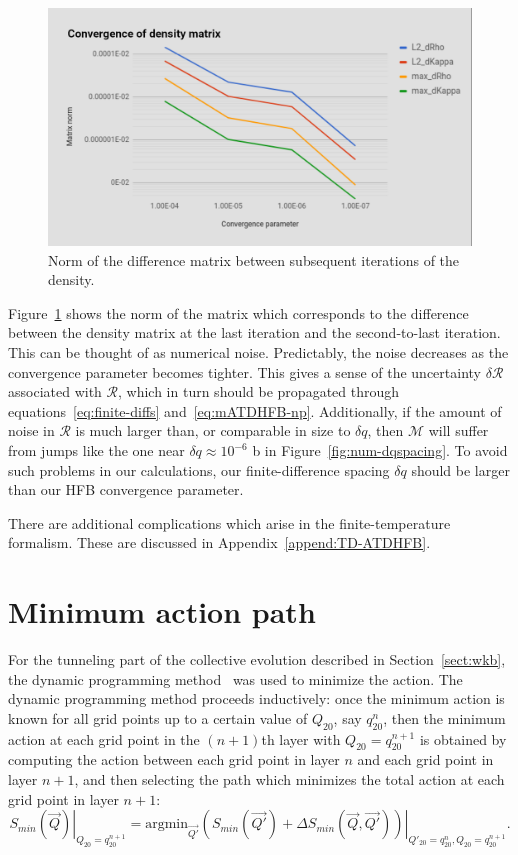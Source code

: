 \begin{figure}
	\centering
	\includegraphics[width=0.7\linewidth]{TeX_files/Num-rho_conv}
	\caption{Norm of the difference matrix between subsequent iterations of the density.}
	\label{fig:num-rhoconv}
\end{figure}

Figure~\ref{fig:num-rhoconv} shows the norm of the matrix which corresponds to the difference between the density matrix at the last iteration and the second-to-last iteration. This can be thought of as numerical noise. Predictably, the noise decreases as the convergence parameter becomes tighter. This gives a sense of the uncertainty $\delta \mathcal{R}$ associated with $\mathcal{R}$, which in turn should be propagated through equations~\eqref{eq:finite-diffs} and~\eqref{eq:mATDHFB-np}. Additionally, if the amount of noise in $\mathcal{R}$ is much larger than, or comparable in size to $\delta q$, then $\mathcal{M}$ will suffer from jumps like the one near $\delta q \approx 10^{-6}$ b in Figure~\ref{fig:num-dqspacing}. To avoid such problems in our calculations, our finite-difference spacing $\delta q$ should be larger than our HFB convergence parameter.

There are additional complications which arise in the finite-temperature formalism. These are discussed in Appendix~\ref{append:TD-ATDHFB}.

\section{Minimum action path}
For the tunneling part of the collective evolution described in Section~\ref{sect:wkb}, the dynamic programming method~\cite{Baran1981} was used to minimize the action. The dynamic programming method proceeds inductively: once the minimum action is known for all grid points up to a certain value of $Q_{20}$, say $q_{20}^n$, then the minimum action at each grid point in the $(n+1)$th layer with $Q_{20}=q_{20}^{n+1}$ is obtained by computing the action between each grid point in layer $n$ and each grid point in layer $n+1$, and then selecting the path which minimizes the total action at each grid point in layer $n+1$:
\begin{equation}
\left.S_{min}(\vec{Q})\right|_{Q_{20}=q_{20}^{n+1}} = \mathrm{argmin}_{\vec{Q'}}\left.\left(S_{min}(\vec{Q'}) + \Delta S_{min}(\vec{Q},\vec{Q'})\right)\right|_{Q'_{20}=q_{20}^{n}, Q_{20}=q_{20}^{n+1}}.
\end{equation}

